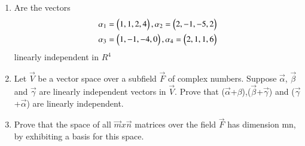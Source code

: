 \renewcommand{\theequation}{\theenumi}
\renewcommand{\thefigure}{\theenumi}
\begin{enumerate}[label=\thesubsection.\arabic*.,ref=\thesubsection.\theenumi]
\item Are the vectors 
\begin{align}
\alpha{_1}=\begin{pmatrix}1,1,2,4\end{pmatrix} , \alpha{_2}=\begin{pmatrix}2,-1,-5,2\end{pmatrix} \\
\alpha{_3}=\begin{pmatrix}1,-1,-4,0\end{pmatrix} , \alpha{_4}=\begin{pmatrix}2,1,1,6\end{pmatrix}
\end{align}
linearly independent in $R^{4}$
%
\\
\solution

\item    Let $\vec{V}$ be a vector space over a subfield $\vec{F}$ of complex numbers. Suppose $\vec{\alpha}$, $\vec{\beta}$ and $\vec{\gamma}$ are linearly independent vectors in $\vec{V}$. Prove that ($\vec{\alpha}$+$\beta$),($\vec{\beta}$+$\vec{\gamma}$) and ($\vec{\gamma}$+$\vec{\alpha}$) are linearly independent.
%
\\
\solution

%
\item Prove that the space of all $\vec{m} x \vec{n}$ matrices over the field $\vec{F}$ has dimension mn, by exhibiting a basis for this space. 
%
\\
\solution

\end{enumerate}
